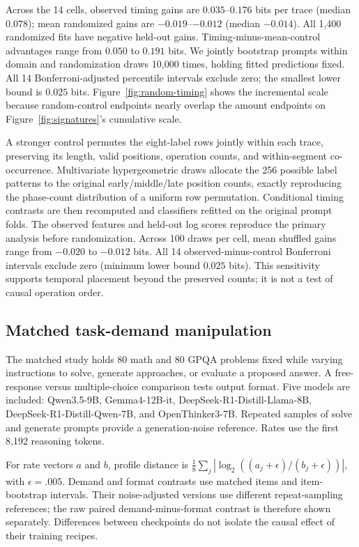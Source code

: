 Across the 14 cells, observed timing gains are $0.035$--$0.176$ bits per trace (median $0.078$); mean randomized gains are $-0.019$--$-0.012$ (median $-0.014$). All 1,400 randomized fits have negative held-out gains. Timing-minus-mean-control advantages range from $0.050$ to $0.191$ bits. We jointly bootstrap prompts within domain and randomization draws 10,000 times, holding fitted predictions fixed. All 14 Bonferroni-adjusted percentile intervals exclude zero; the smallest lower bound is $0.025$ bits. Figure~\ref{fig:random-timing} shows the incremental scale because random-control endpoints nearly overlap the amount endpoints on Figure~\ref{fig:signatures}'s cumulative scale.

A stronger control permutes the eight-label rows jointly within each trace, preserving its length, valid positions, operation counts, and within-segment co-occurrence. Multivariate hypergeometric draws allocate the 256 possible label patterns to the original early/middle/late position counts, exactly reproducing the phase-count distribution of a uniform row permutation. Conditional timing contrasts are then recomputed and classifiers refitted on the original prompt folds. The observed features and held-out log scores reproduce the primary analysis before randomization. Across 100 draws per cell, mean shuffled gains range from $-0.020$ to $-0.012$ bits. All 14 observed-minus-control Bonferroni intervals exclude zero (minimum lower bound $0.025$ bits). This sensitivity supports temporal placement beyond the preserved counts; it is not a test of causal operation order.

\subsection{Matched task-demand manipulation}
The matched study holds 80 math and 80 GPQA problems fixed while varying instructions to solve, generate approaches, or evaluate a proposed answer. A free-response versus multiple-choice comparison tests output format. Five models are included: Qwen3.5-9B, Gemma4-12B-it, DeepSeek-R1-Distill-Llama-8B, DeepSeek-R1-Distill-Qwen-7B, and OpenThinker3-7B. Repeated samples of solve and generate prompts provide a generation-noise reference. Rates use the first 8,192 reasoning tokens.

For rate vectors $a$ and $b$, profile distance is $\frac18\sum_j|\log_2((a_j+\epsilon)/(b_j+\epsilon))|$, with $\epsilon=.005$. Demand and format contrasts use matched items and item-bootstrap intervals. Their noise-adjusted versions use different repeat-sampling references; the raw paired demand-minus-format contrast is therefore shown separately. Differences between checkpoints do not isolate the causal effect of their training recipes.

